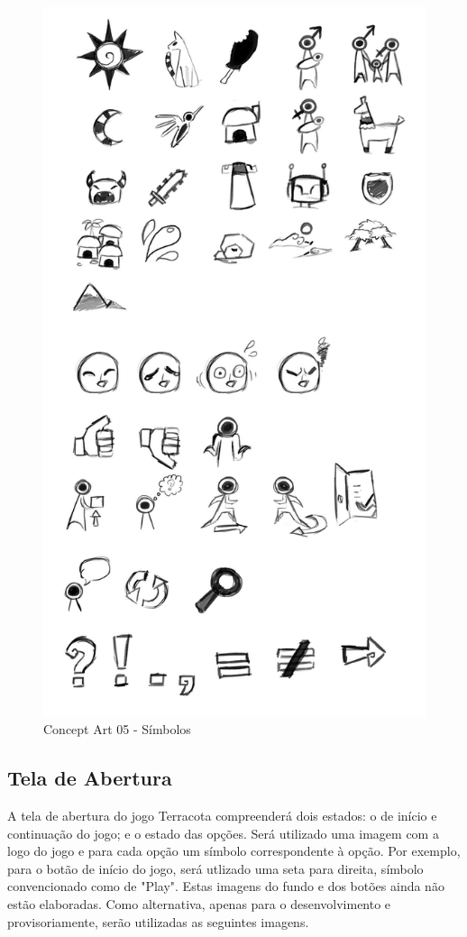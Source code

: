 \documentclass[12pt]{article}
\begin{document}
\begin{figure}[hp]
    \centering
    \includegraphics[scale=0.16]{concept_art_05.jpg}
    \caption{Concept Art 05 - Símbolos}
    \label{fig:concept_art_05}
\end{figure}

\newpage
\subsection{Tela de Abertura}
A tela de abertura do jogo Terracota compreenderá dois estados: o de início e
continuação do jogo; e o estado das opções. Será utilizado uma imagem com a
logo do jogo e para cada opção um símbolo correspondente à opção. Por exemplo,
para o botão de início do jogo, será utlizado uma seta para direita, símbolo
convencionado como de "Play". Estas imagens do fundo e dos botões ainda não
estão elaboradas. Como alternativa, apenas para o desenvolvimento e provisoriamente,
serão utilizadas as seguintes imagens.
\end{document}
